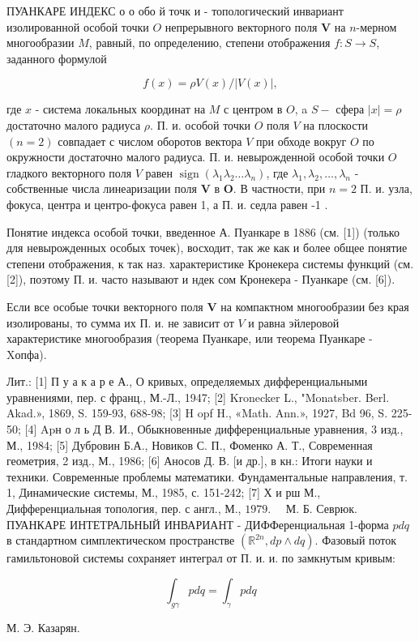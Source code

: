 \documentclass[10pt]{article}
\begin{document}
ПУАНКАРЕ ИНДЕКС о о обо й точк и - топологический инвариант изолированной особой точки $O$ непрерывного векторного поля $\boldsymbol{V}$ на $n$-мерном многообразии $M$, равный, по определению, степени отображения $f: S \rightarrow S$, заданного формулой



\[

f(x)=\rho V(x) /|V(x)|,

\]



где $x$ - система локальных координат на $M$ с центром в $O$, a $S-$ сфера $|x|=\rho$ достаточно малого радиуса $\rho$. П. и. особой точки $O$ поля $V$ на плоскости $(n=2)$ совпадает с числом оборотов вектора $V$ при обходе вокруг $O$ по окружности достаточно малого радиуса. П. и. невырожденной особой точки $O$ гладкого векторного поля $V$ равен $\operatorname{sign}\left(\lambda_{1} \lambda_{2} \ldots \lambda_{n}\right)$, где $\lambda_{1}, \lambda_{2}, \ldots, \lambda_{n}$ - собственные числа линеаризации поля $\boldsymbol{V}$ в $\boldsymbol{O}$. В частности, при $n=2$ П. и. узла, фокуса, центра и центро-фокуса равен 1, а П. и. седла равен -1 .



Понятие индекса особой точки, введенное А. Пуанкаре в 1886 (см. [1]) (только для невырожденных особых точек), восходит, так же как и более общее понятие степени отображения, к так наз. характеристике Кронекера системы функций (см. [2]), поэтому П. и. часто называют и ндек сом Кронекера - Пуанкаре (см. [6]).



Если все особые точки векторного поля $\boldsymbol{V}$ на компактном многообразии без края изолированы, то сумма их П. и. не зависит от $V$ и равна эйлеровой характеристике многообразия (теорема Пуанкаре, или теорема Пуанкаре - Xопфа).



Лит.: [1] П у а к а р е А., О кривых, определяемых дифференциальными уравнениями, пер. с франц., М.-Л., 1947; [2] Kronecker L., "Monatsber. Berl. Akad.», 1869, S. 159-93, 688-98; [3] H opf H., «Math. Ann.», 1927, Bd 96, S. 225-50; [4] Apн о л ь Д В. И., Обыкновенные дифференциальные уравнения, 3 изд., М., 1984; [5] Дубровин Б.А., Новиков С. П., Фоменко А. Т., Современная геометрия, 2 изд., М., 1986; [6] Аносов Д. В. [и др.], в кн.: Итоги науки и техники. Современные проблемы математики. Фундаментальные направления, т. 1, Динамические системы, М., 1985, с. 151-242; [7] Х и рш М., Дифференциальная топология, пер. с англ., М., $1979 . \quad$ М. Б. Севрюк. ПУАНКАРЕ ИНТЕТРАЛЬНЫЙ ИНВАРИАНТ - ДИФФеренциальная 1-форма $p d q$ в стандартном симплектическом пространстве $\left(\mathbb{R}^{2 n}, d p \wedge d q\right)$. Фазовый поток гамильтоновой системы сохраняет интеграл от П. и. и. по замкнутым кривым:



\[

\int_{g \gamma} p d q=\int_{\gamma} p d q

\]



М. Э. Казарян.
\end{document}

